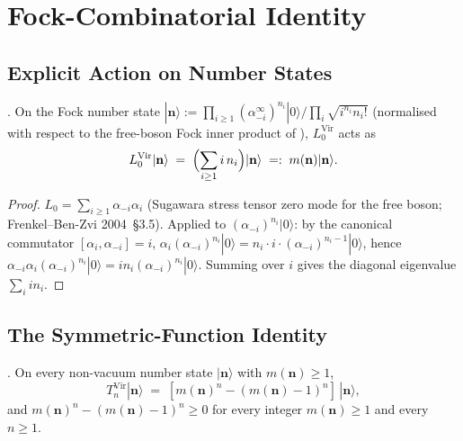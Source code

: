 \section{Fock-Combinatorial Identity}
\label{v4-arith:vb:fock-combinatorial}

\subsection{Explicit Action on Number States}
\label{v4-arith:vb:number-states}

\begin{lemma}
\label{v4-arith:vb:lem:diagonal-action}
\ClaimStatusProvedHere. On the Fock number state
\(|\mathbf{n}\rangle:=\prod_{i\geq 1}(\alpha_{-i}^{\infty})^{n_{i}}|0\rangle\big/\prod_{i}\sqrt{i^{n_{i}}n_{i}!}\)
(normalised with respect to the free-boson Fock inner product of
), \(L_{0}^{\mathrm{Vir}}\)
acts as
\begin{equation}
\label{v4-arith:vb:eq:L_0-action}
L_{0}^{\mathrm{Vir}}|\mathbf{n}\rangle\;=\;\Bigl(\sum_{i\geq 1}i\,n_{i}\Bigr)|\mathbf{n}\rangle\;=:\;m(\mathbf{n})|\mathbf{n}\rangle.
\end{equation}
\end{lemma}

\begin{proof}
\(L_{0}=\sum_{i\geq 1}\alpha_{-i}\alpha_{i}\) (Sugawara stress tensor
zero mode for the free boson; Frenkel--Ben-Zvi 2004~\S3.5). Applied
to \((\alpha_{-i})^{n_{i}}|0\rangle\): by the canonical commutator
\([\alpha_{i},\alpha_{-i}]=i\), \(\alpha_{i}(\alpha_{-i})^{n_{i}}|0\rangle=n_{i}\cdot i\cdot(\alpha_{-i})^{n_{i}-1}|0\rangle\),
hence \(\alpha_{-i}\alpha_{i}(\alpha_{-i})^{n_{i}}|0\rangle=i n_{i}(\alpha_{-i})^{n_{i}}|0\rangle\).
Summing over \(i\) gives the diagonal eigenvalue \(\sum_{i}i n_{i}\).
\end{proof}

\subsection{The Symmetric-Function Identity}
\label{v4-arith:vb:symmetric-identity}

\begin{theorem}
\label{v4-arith:vb:thm:fock-combinatorial-positivity}
\ClaimStatusProvedHere. On every non-vacuum number state
\(|\mathbf{n}\rangle\) with \(m(\mathbf{n})\geq 1\),
\begin{equation}
\label{v4-arith:vb:eq:fock-positivity}
T_{n}^{\mathrm{Vir}}|\mathbf{n}\rangle\;=\;[m(\mathbf{n})^{n}-(m(\mathbf{n})-1)^{n}]\,|\mathbf{n}\rangle,
\end{equation}
and \(m(\mathbf{n})^{n}-(m(\mathbf{n})-1)^{n}\geq 0\) for every
integer \(m(\mathbf{n})\geq 1\) and every \(n\geq 1\).
\end{theorem}

